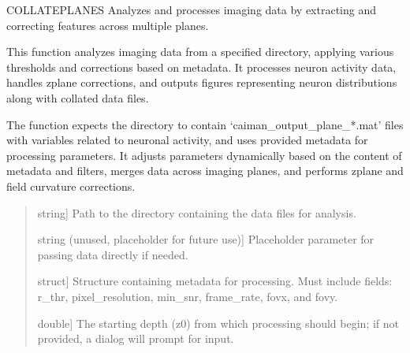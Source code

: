 \documentclass[letterpaper,10pt,english]{sphinxmanual}
\begin{document}
\begin{fulllineitems}
\label{\detokenize{api/core:collatePlanes}}
\pysigstartsignatures
{}
\pysigstopsignatures
\sphinxAtStartPar
COLLATEPLANES Analyzes and processes imaging data by extracting and correcting features across multiple planes.

\sphinxAtStartPar
This function analyzes imaging data from a specified directory, applying
various thresholds and corrections based on metadata. It processes neuron
activity data, handles z\sphinxhyphen{}plane corrections, and outputs figures representing
neuron distributions along with collated data files.

\sphinxAtStartPar
The function expects the directory to contain ‘caiman\_output\_plane\_*.mat’ files
with variables related to neuronal activity, and uses provided metadata for
processing parameters. It adjusts parameters dynamically based on the content
of metadata and filters, merges data across imaging planes, and performs
z\sphinxhyphen{}plane and field curvature corrections.
\begin{quote}\begin{description}
\begin{description}
\sphinxlineitem{\sphinxstylestrong{dataPath}}{[}string{]}
\sphinxAtStartPar
Path to the directory containing the data files for analysis.

\sphinxlineitem{\sphinxstylestrong{data}}{[}string (unused, placeholder for future use){]}
\sphinxAtStartPar
Placeholder parameter for passing data directly if needed.

\sphinxlineitem{\sphinxstylestrong{metadata}}{[}struct{]}
\sphinxAtStartPar
Structure containing metadata for processing. Must include fields:
r\_thr, pixel\_resolution, min\_snr, frame\_rate, fovx, and fovy.

\sphinxlineitem{\sphinxstylestrong{startDepth}}{[}double{]}
\sphinxAtStartPar
The starting depth (z0) from which processing should begin; if not
provided, a dialog will prompt for input.

\end{description}

\begin{description}
\end{description}


\end{description}
\end{quote}
\end{fulllineitems}
\end{document}
